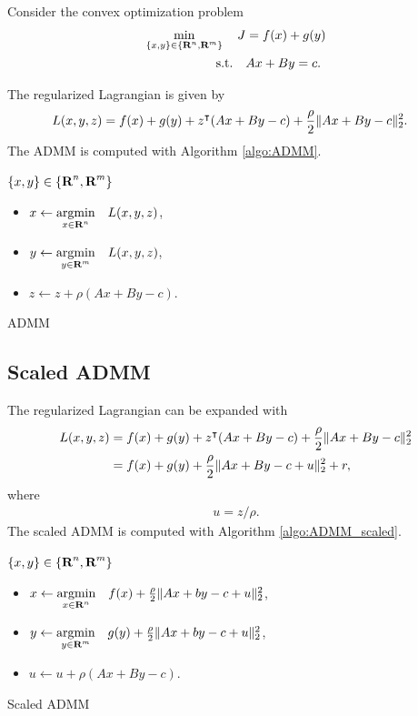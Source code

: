 \documentclass{article}
\begin{document}
    Consider the convex optimization problem
    \begin{align*}
        \min_{\{x,y\}\in\{\textbf{R}^n,\textbf{R}^m\}}\quad J&=f(x)+g(y)\\
        \text{s.t.}\quad &Ax+By=c.
    \end{align*}

    The regularized Lagrangian is given by 
    \begin{align*}
        L(x,y,z)&=f(x)+g(y)+z^\intercal (Ax+By-c)+\frac{\rho}{2}\|Ax+By-c\|_2^2.
    \end{align*}
    The ADMM is computed with Algorithm \ref{algo:ADMM}.

    \begin{algorithm}[H]
        \SetAlgoLined
        $\{x,y\} \in\{\textbf{R}^n,\textbf{R}^m\}$\\
        {
            \begin{itemize}
                \item $x\leftarrow \underset{x\in\textbf{R}^n}{\text{argmin}} \quad L(x,y,z)$,
                \item $y\leftarrow \underset{y\in\textbf{R}^m}{\text{argmin}} \quad L(x,y,z)$,
                \item $z\leftarrow z + \rho (Ax+By-c)$.
            \end{itemize}
        }
    \caption{ADMM}
    \label{algo:ADMM}
    \end{algorithm}

\subsection{Scaled ADMM}

    The regularized Lagrangian can be expanded with
    \begin{align*}
        L(x,y,z)&=f(x)+g(y)+z^\intercal (Ax+By-c)+\frac{\rho}{2}\|Ax+By-c\|_2^2\\
        &=f(x)+g(y)+\frac{\rho}{2}\|Ax+By-c+u\|_2^2+r,
    \end{align*}
    where
    \begin{align*}
        u = z/\rho.
    \end{align*}
    The scaled ADMM is computed with Algorithm \ref{algo:ADMM_scaled}.

    \begin{algorithm}[H]
        \SetAlgoLined
        $\{x,y\} \in\{\textbf{R}^n,\textbf{R}^m\}$\\
        {
            \begin{itemize}
                \item $x\leftarrow \underset{x\in\textbf{R}^n}{\text{argmin}} \quad f(x)+\frac{\rho}{2}\|Ax+by-c+u\|_2^2$,
                \item $y\leftarrow \underset{y\in\textbf{R}^m}{\text{argmin}} \quad g(y)+\frac{\rho}{2}\|Ax+by-c+u\|_2^2$,
                \item $u\leftarrow u + \rho (Ax+By-c)$.
            \end{itemize}
        }
    \caption{Scaled ADMM}
    \label{algo:ADMM_scaled}
    \end{algorithm}
\clearpage
\end{document}
